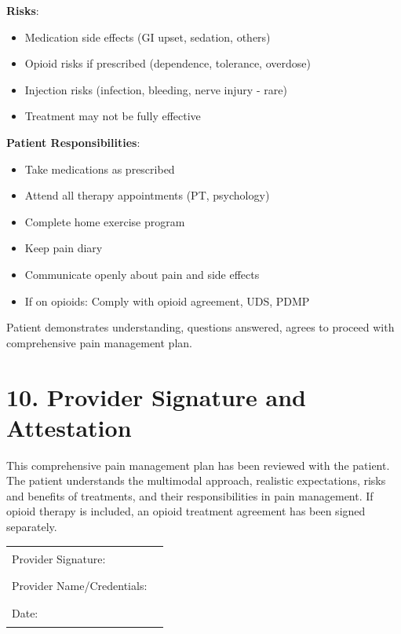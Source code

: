 \documentclass[11pt,letterpaper]{article}
\begin{document}
\textbf{Risks}:
\begin{itemize}[leftmargin=*]
    \item Medication side effects (GI upset, sedation, others)
    \item Opioid risks if prescribed (dependence, tolerance, overdose)
    \item Injection risks (infection, bleeding, nerve injury - rare)
    \item Treatment may not be fully effective
\end{itemize}

\textbf{Patient Responsibilities}:
\begin{itemize}[leftmargin=*]
    \item Take medications as prescribed
    \item Attend all therapy appointments (PT, psychology)
    \item Complete home exercise program
    \item Keep pain diary
    \item Communicate openly about pain and side effects
    \item If on opioids: Comply with opioid agreement, UDS, PDMP
\end{itemize}

Patient demonstrates understanding, questions answered, agrees to proceed with comprehensive pain management plan.

\vspace{2em}

\section*{10. Provider Signature and Attestation}

This comprehensive pain management plan has been reviewed with the patient. The patient understands the multimodal approach, realistic expectations, risks and benefits of treatments, and their responsibilities in pain management. If opioid therapy is included, an opioid treatment agreement has been signed separately.

\vspace{1em}

\begin{tabular}{ll}
Provider Signature: & \rule{7cm}{0.5pt} \\[1em]
Provider Name/Credentials: & \rule{7cm}{0.5pt} \\[1em]
Date: & \rule{4cm}{0.5pt} \\[2em]
\end{tabular}
\end{document}
